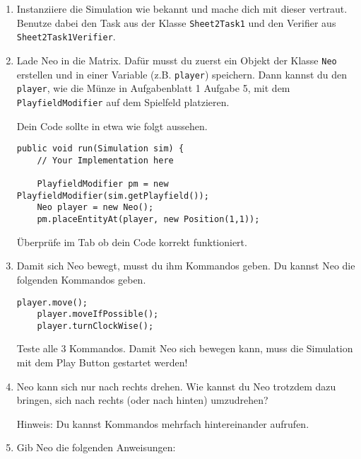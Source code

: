 



\begin{enumerate}
    \item Instanziiere die Simulation wie bekannt und mache dich mit dieser vertraut. 
        Benutze dabei den Task aus der Klasse \lstinline{Sheet2Task1} und den Verifier aus \lstinline{Sheet2Task1Verifier}.
    \item Lade Neo in die Matrix.
        Dafür musst du zuerst ein Objekt der Klasse \lstinline{Neo} erstellen und in einer Variable (z.B. \lstinline{player}) speichern.
        Dann kannst du den \lstinline{player}, wie die Münze in Aufgabenblatt 1 Aufgabe 5, mit dem \lstinline{PlayfieldModifier} auf dem Spielfeld platzieren.

        Dein Code sollte in etwa wie folgt aussehen.

        \begin{lstlisting}[firstnumber=14]
public void run(Simulation sim) {
    // Your Implementation here

    PlayfieldModifier pm = new PlayfieldModifier(sim.getPlayfield());
    Neo player = new Neo();
    pm.placeEntityAt(player, new Position(1,1));
        \end{lstlisting}

        Überprüfe im  Tab ob dein Code korrekt funktioniert.
    \item Damit sich Neo bewegt, musst du ihm Kommandos geben.
        Du kannst Neo die folgenden Kommandos geben.

        \begin{lstlisting}[firstnumber=20]
    player.move();
    player.moveIfPossible();
    player.turnClockWise();
        \end{lstlisting}

        Teste alle 3 Kommandos.
        Damit Neo sich bewegen kann, muss die Simulation mit dem Play Button gestartet werden!
    \item Neo kann sich nur nach rechts drehen.
        Wie kannst du Neo trotzdem dazu bringen, sich nach rechts (oder nach hinten) umzudrehen?

        Hinweis: Du kannst Kommandos mehrfach hintereinander aufrufen.
    \item Gib Neo die folgenden Anweisungen:
        

\end{enumerate}
